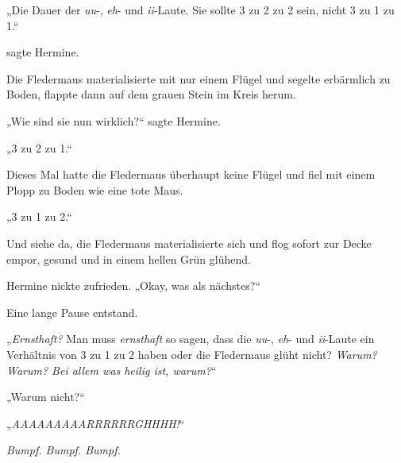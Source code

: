 „Die Dauer der \emph{uu}-, \emph{eh}- und \emph{ii}-Laute. Sie sollte 3 zu 2 zu 2 sein, nicht 3 zu 1 zu 1.“

 sagte Hermine.

Die Fledermaus materialisierte mit nur einem Flügel und segelte erbärmlich zu Boden, flappte dann auf dem grauen Stein im Kreis herum.

„Wie sind sie nun wirklich?“ sagte Hermine.

„3 zu 2 zu 1.“


Dieses Mal hatte die Fledermaus überhaupt keine Flügel und fiel mit einem Plopp zu Boden wie eine tote Maus.

„3 zu 1 zu 2.“

Und siehe da, die Fledermaus materialisierte sich und flog sofort zur Decke empor, gesund und in einem hellen Grün glühend.

Hermine nickte zufrieden.
„Okay, was als nächstes?“

Eine lange Pause entstand.

„\emph{Ernsthaft?} Man muss \emph{ernsthaft} so  sagen, dass die \emph{uu}-, \emph{eh}- und \emph{ii}-Laute ein Verhältnis von 3 zu 1 zu 2 haben oder die Fledermaus glüht nicht? \emph{Warum? Warum? Bei allem was heilig ist, warum?}“

„Warum nicht?“

„\emph{AAAAAAAAARRRRRRGHHHH!}“

\emph{Bumpf. Bumpf. Bumpf.}

